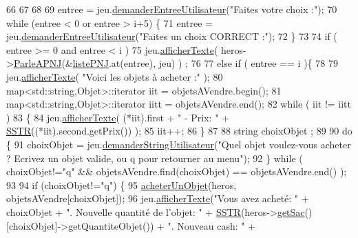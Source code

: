 \begin{DoxyCode}
66 
67 
68 
69         entree = jeu.\hyperlink{class_jeu_ac504a2a26ad7aa3c4281f8ab40cdc445}{demanderEntreeUtilisateur}(\textcolor{stringliteral}{"Faites votre choix :"});
70         \textcolor{keywordflow}{while} (entree < 0 or entree > i+5) \{
71             entree = jeu.\hyperlink{class_jeu_ac504a2a26ad7aa3c4281f8ab40cdc445}{demanderEntreeUtilisateur}(\textcolor{stringliteral}{"Faites un choix CORRECT :"});
72         \}
73 
74         \textcolor{keywordflow}{if} ( entree >= 0 and entree < i )
75             jeu.\hyperlink{class_jeu_aa09fb40439f16b9665a0d76679f78e4e}{afficherTexte}( heros->\hyperlink{class_heros_a4052af6e407ebdf4918e62340d374829}{ParleAPNJ}(&\hyperlink{class_lieu_a8c1e20b105f7972f22d8f16651de4ebd}{listePNJ}.at(entree), jeu) ) 
      ;
76 
77         \textcolor{keywordflow}{else} \textcolor{keywordflow}{if} ( entree == i )\{
78 
79             jeu.\hyperlink{class_jeu_aa09fb40439f16b9665a0d76679f78e4e}{afficherTexte}( \textcolor{stringliteral}{"Voici les objets à acheter :"} );
80             map<std::string,Objet>::iterator iit = objetsAVendre.begin();
81             map<std::string,Objet>::iterator iitt = objetsAVendre.end();
82             \textcolor{keywordflow}{while} ( iit != iitt )
83             \{
84                 jeu.\hyperlink{class_jeu_aa09fb40439f16b9665a0d76679f78e4e}{afficherTexte}( (*iit).first + \textcolor{stringliteral}{" - Prix: "} +  
      \hyperlink{superette_8cpp_a0d2f37137ee1fd6ff4a0ef803849dd63}{SSTR}((*iit).second.getPrix())   );
85                 iit++;
86             \}
87 
88             \textcolor{keywordtype}{string} choixObjet ;
89 
90             \textcolor{keywordflow}{do} \{
91             choixObjet = jeu.\hyperlink{class_jeu_a4b70e906117c6a21b989ad3ab672c83c}{demanderStringUtilisateur}(\textcolor{stringliteral}{"Quel objet voulez-vous
       acheter ? Ecrivez un objet valide, ou q pour retourner au menu"});
92             \} \textcolor{keywordflow}{while} ( choixObjet!=\textcolor{stringliteral}{"q"} && objetsAVendre.find(choixObjet) == objetsAVendre.end() );
93 
94             \textcolor{keywordflow}{if} (choixObjet!=\textcolor{stringliteral}{"q"}) \{
95                 \hyperlink{class_superette_a03c5890e470b71e24e59e2b018286a18}{acheterUnObjet}(heros, objetsAVendre[choixObjet]);
96                 jeu.\hyperlink{class_jeu_aa09fb40439f16b9665a0d76679f78e4e}{afficherTexte}(\textcolor{stringliteral}{"Vous avez acheté: "} + choixObjet + \textcolor{stringliteral}{". Nouvelle quantité de
       l'objet: "} + \hyperlink{superette_8cpp_a0d2f37137ee1fd6ff4a0ef803849dd63}{SSTR}(heros->\hyperlink{class_heros_a62d8b172e82dbb0a1d2c23da21bdb069}{getSac}()[choixObjet]->getQuantiteObjet()) + \textcolor{stringliteral}{". Nouveau cash: "} + 

\end{DoxyCode}
